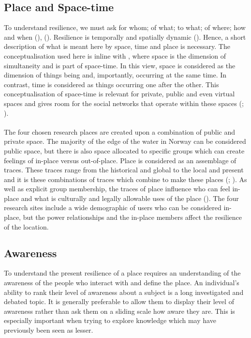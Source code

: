 \subsection{Place and Space-time} 
To understand resilience, we must ask for whom; of what; to what; of where; how and when (\cite{cutter_community_2020}), (\cite{moser_turbulent_2019}). Resilience is temporally and spatially dynamic (\cite{cutter_community_2020}). Hence, a short description of what is meant here by space, time and place is necessary. The conceptualisation used here is inline with \cite{massey_for_2005}, where space is the dimension of simultaneity and is part of space-time. In this view, space is considered as the dimension of things being and, importantly, occurring at the same time. In contrast, time is considered as things occurring one after the other. This conceptualisation of space-time is relevant for private, public and even virtual spaces and gives room for the social networks that operate within these spaces (\cite{massey_for_2005}; \cite{allen_rethinking_1998}).

\paragraph{}
The four chosen research places are created upon a combination of public and private space. The majority of the edge of the water in Norway can be considered public space, but there is also space allocated to specific groups which can create feelings of in-place versus out-of-place. Place is considered as an assemblage of traces. These traces range from the historical and global to the local and present and it is these combinations of traces which combine to make these places (\cite{anderson_understanding_2015}; \cite{massey_for_2005}). As well as explicit group membership, the traces of place influence who can feel in-place and what is culturally and legally allowable uses of the place (\cite{anderson_understanding_2015}). The four research sites include a wide demographic of users who can be considered in-place, but the power relationships and the in-place members affect the resilience of the location. 

\subsection{Awareness}
To understand the present resilience of a place requires an understanding of the awareness of the people who interact with and define the place. An individual’s ability to rank their level of awareness about a subject is a long investigated and debated topic. It is generally preferable to allow them to display their level of awareness rather than ask them on a sliding scale how aware they are. This is especially important when trying to explore knowledge which may have previously been seen as lesser.

